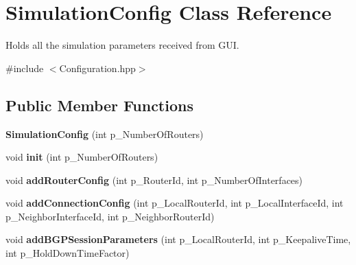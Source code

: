 \hypertarget{classSimulationConfig}{\section{Simulation\-Config Class Reference}
\label{classSimulationConfig}
}


Holds all the simulation parameters received from G\-U\-I.  




{\ttfamily \#include $<$Configuration.\-hpp$>$}

\subsection*{Public Member Functions}
\begin{DoxyCompactItemize}
\item 
\hypertarget{classSimulationConfig_ab3138278034afec998556d14f962279d}{{\bfseries Simulation\-Config} (int p\-\_\-\-Number\-Of\-Routers)}\label{classSimulationConfig_ab3138278034afec998556d14f962279d}

\item 
\hypertarget{classSimulationConfig_a33a33ed001652269877187a5dba500e8}{void {\bfseries init} (int p\-\_\-\-Number\-Of\-Routers)}\label{classSimulationConfig_a33a33ed001652269877187a5dba500e8}

\item 
\hypertarget{classSimulationConfig_a4d3f7e7012dae6304dd35e1c2f8fba60}{void {\bfseries add\-Router\-Config} (int p\-\_\-\-Router\-Id, int p\-\_\-\-Number\-Of\-Interfaces)}\label{classSimulationConfig_a4d3f7e7012dae6304dd35e1c2f8fba60}

\item 
\hypertarget{classSimulationConfig_a05a2f2aa506808c1d65c21beeb91d875}{void {\bfseries add\-Connection\-Config} (int p\-\_\-\-Local\-Router\-Id, int p\-\_\-\-Local\-Interface\-Id, int p\-\_\-\-Neighbor\-Interface\-Id, int p\-\_\-\-Neighbor\-Router\-Id)}\label{classSimulationConfig_a05a2f2aa506808c1d65c21beeb91d875}

\item 
\hypertarget{classSimulationConfig_ad270719409152a88ce192dbb7f3cbff2}{void {\bfseries add\-B\-G\-P\-Session\-Parameters} (int p\-\_\-\-Local\-Router\-Id, int p\-\_\-\-Keepalive\-Time, int p\-\_\-\-Hold\-Down\-Time\-Factor)}\label{classSimulationConfig_ad270719409152a88ce192dbb7f3cbff2}


\end{DoxyCompactItemize}
